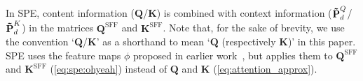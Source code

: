 In SPE, content information ($\mathbf{Q}$/$\mathbf{K}$) is combined with context information ($\mathbf{\tilde{\text{$\mathbf{P}$}}}^Q_d$/$\mathbf{\tilde{\text{$\mathbf{P}$}}}^K_d$) in the matrices $\mathbf{Q}^{\text{SFF}}$ and $\mathbf{K}^{\text{SFF}}$. Note that, for the sake of brevity, we use the convention `$\mathbf{Q}$/$\mathbf{K}$' as a shorthand to mean `$\mathbf{Q}$ (respectively $\mathbf{K}$)' in this paper. SPE uses the feature maps $\phi$ proposed in earlier work~\cite{katharopoulos_transformers_2020,zhuoran_efficient_2021}, but applies them to $\mathbf{Q}^{\text{SFF}}$ and $\mathbf{K}^{\text{SFF}}$ (\ref{eq:spe:ohyeah}) instead of $\mathbf{Q}$ and $\mathbf{K}$ (\ref{eq:attention_approx}).
